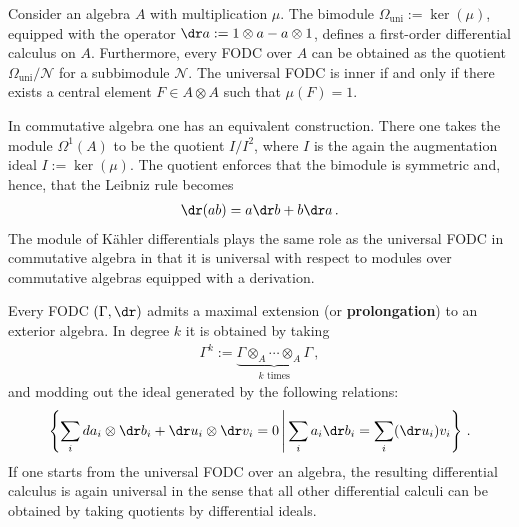     \begin{example}
        Consider an algebra $A$ with multiplication $\mu$. The bimodule $\Omega_\text{uni}:=\ker(\mu)$, equipped with the operator $\dr a:=1\otimes a-a\otimes1$, defines a first-order differential calculus on $A$. Furthermore, every FODC over $A$ can be obtained as the quotient $\Omega_\text{uni}/\mathcal{N}$ for a subbimodule $\mathcal{N}$. The universal FODC is inner if and only if there exists a central element $F\in A\otimes A$ such that $\mu(F)=1$.
    \end{example}
    \begin{example}
        In commutative algebra one has an equivalent construction. There one takes the module $\Omega^1(A)$ to be the quotient $I/I^2$, where $I$ is the again the augmentation ideal $I:=\ker(\mu)$. The quotient enforces that the bimodule is symmetric and, hence, that the Leibniz rule becomes
        \begin{gather}
            \dr(ab) = a\dr b + b\dr a\,.
        \end{gather}
        The module of K\"ahler differentials plays the same role as the universal FODC in commutative algebra in that it is universal with respect to modules over commutative algebras equipped with a derivation.
    \end{example}


    \begin{property}[Prolongation]\label{nca:prolongation}
        Every FODC $(\Gamma,\dr)$ admits a maximal extension (or \textbf{prolongation}) to an exterior algebra. In degree $k$ it is obtained by taking
        \begin{gather}
            \Gamma^k := \underbrace{\Gamma\otimes_A\cdots\otimes_A\Gamma}_{k\text{ times}}\,,
        \end{gather}
        and modding out the ideal generated by the following relations:
        \begin{gather}
            \left\{\sum_ida_i\otimes\dr b_i+\dr u_i\otimes\dr v_i=0\,\middle\vert\,\sum_ia_i\dr b_i=\sum_i(\dr u_i)v_i\right\}\,.
        \end{gather}
        If one starts from the universal FODC over an algebra, the resulting differential calculus is again universal in the sense that all other differential calculi can be obtained by taking quotients by differential ideals.
    \end{property}

